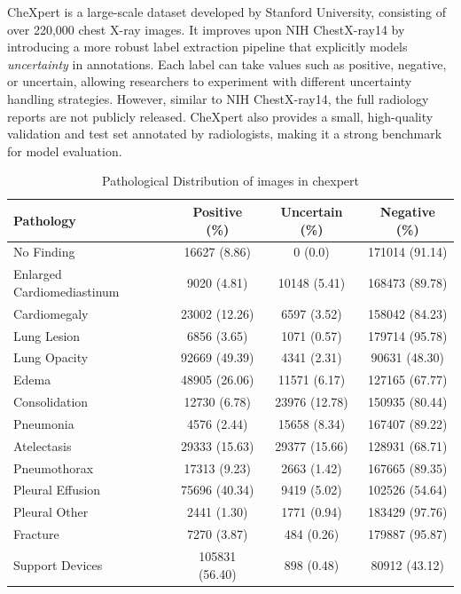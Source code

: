 CheXpert \cite{Irvin2019} is a large-scale dataset developed by Stanford University, consisting of over 220,000 chest X-ray images. It improves upon NIH ChestX-ray14 by introducing a more robust label extraction pipeline that explicitly models \textit{uncertainty} in annotations.
Each label can take values such as positive, negative, or uncertain, allowing researchers to experiment with different uncertainty handling strategies. However, similar to NIH ChestX-ray14, the full radiology reports are not publicly released.
CheXpert also provides a small, high-quality validation and test set annotated by radiologists, making it a strong benchmark for model evaluation.
\cite{chexpert_dataset}
\begin{table}[h!]
\centering
\caption{Pathological Distribution of images in chexpert}
\label{tab:chexpert_distribution}
\begin{tabular}{lccc}
\hline
\textbf{Pathology} & \textbf{Positive (\%)} & \textbf{Uncertain (\%)} & \textbf{Negative (\%)} \\
\hline
No Finding & 16627 (8.86) & 0 (0.0) & 171014 (91.14) \\
Enlarged Cardiomediastinum & 9020 (4.81) & 10148 (5.41) & 168473 (89.78) \\
Cardiomegaly & 23002 (12.26) & 6597 (3.52) & 158042 (84.23) \\
Lung Lesion & 6856 (3.65) & 1071 (0.57) & 179714 (95.78) \\
Lung Opacity & 92669 (49.39) & 4341 (2.31) & 90631 (48.30) \\
Edema & 48905 (26.06) & 11571 (6.17) & 127165 (67.77) \\
Consolidation & 12730 (6.78) & 23976 (12.78) & 150935 (80.44) \\
Pneumonia & 4576 (2.44) & 15658 (8.34) & 167407 (89.22) \\
Atelectasis & 29333 (15.63) & 29377 (15.66) & 128931 (68.71) \\
Pneumothorax & 17313 (9.23) & 2663 (1.42) & 167665 (89.35) \\
Pleural Effusion & 75696 (40.34) & 9419 (5.02) & 102526 (54.64) \\
Pleural Other & 2441 (1.30) & 1771 (0.94) & 183429 (97.76) \\
Fracture & 7270 (3.87) & 484 (0.26) & 179887 (95.87) \\
Support Devices & 105831 (56.40) & 898 (0.48) & 80912 (43.12) \\
\hline
\end{tabular}
\end{table}
